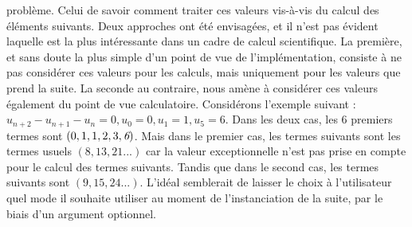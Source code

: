 \documentclass[12pt]{article}
\begin{document}
        problème. Celui de savoir comment traiter ces valeurs vis-à-vis du calcul des
        éléments suivants. Deux approches ont été envisagées, et il n'est pas évident
        laquelle est la plus intéressante dans un cadre de calcul scientifique.
        La première, et sans doute la plus simple d'un point de vue de l'implémentation,
        consiste à ne pas considérer ces valeurs pour les calculs, mais uniquement
        pour les valeurs que prend la suite. La seconde au contraire, nous amène à considérer
        ces valeurs également du point de vue calculatoire. Considérons l'exemple suivant :
        $u_{n+2} - u_{n+1} - u_n = 0, u_0=0, u_1=1, u_5=6$. Dans les deux cas, les 6 premiers
        termes sont $(0,1,1,2,3,\emph{6})$. Mais dans le premier cas, les termes suivants sont
        les termes usuels $(8,13,21...)$ car la valeur exceptionnelle n'est pas prise en
        compte pour le calcul des termes suivants. Tandis que dans le second cas, les termes
        suivants sont $(9,15,24...)$. L'idéal semblerait de laisser le choix à l'utilisateur
        quel mode il souhaite utiliser au moment de l'instanciation de la suite, par le biais
        d'un argument optionnel.
\end{document}

